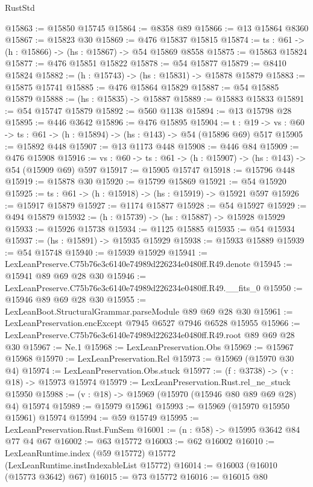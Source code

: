 \begin{lexlean}{RustStd}
\begin{coremodule}
@15863 := @15850 @15745
@15864 := @8358 @89
@15866 := @13 @15864 @8360
@15867 := @15823 @30
@15869 := @476 @15837 @15815
@15874 := {ts : @61} -> (h : @15866) -> (hs : @15867) -> @54 @15869 @8558
@15875 := @15863 @15824
@15877 := @476 @15851 @15822
@15878 := @54 @15877
@15879 := @8410 @15824
@15882 := (h : @15743) -> (hs : @15831) -> @15878 @15879
@15883 := @15875 @15741
@15885 := @476 @15864 @15829
@15887 := @54 @15885 @15879
@15888 := (hs : @15835) -> @15887
@15889 := @15883 @15833
@15891 := @54 @15747 @15879
@15892 := @560 @1138
@15894 := @13 @15798 @28
@15895 := @446 @3642
@15896 := @476 @15895
@15904 := {t : @19} ->
  {vs : @60} -> {ts : @61} -> (h : @15894) -> (hs : @143) -> @54 (@15896 @69) @517
@15905 := @15892 @448
@15907 := @13 @1173 @448
@15908 := @446 @84
@15909 := @476 @15908
@15916 := {vs : @60} -> {ts : @61} -> (h : @15907) -> (hs : @143) -> @54 (@15909 @69) @597
@15917 := @15905 @15747
@15918 := @15796 @448
@15919 := @15878 @30
@15920 := @15799 @15869
@15921 := @54 @15920
@15925 := {ts : @61} -> (h : @15918) -> (hs : @15919) -> @15921 @597
@15926 := @15917 @15879
@15927 := @1174 @15877
@15928 := @54 @15927
@15929 := @494 @15879
@15932 := (h : @15739) -> (hs : @15887) -> @15928 @15929
@15933 := @15926 @15738
@15934 := @1125 @15885
@15935 := @54 @15934
@15937 := (hs : @15891) -> @15935 @15929
@15938 := @15933 @15889
@15939 := @54 @15748
@15940 := @15939 @15929
@15941 := LexLeanPreserve.C75b76e3c6140e74989d226234e0480ff.R49.denote
@15945 := @15941 @89 @69 @28 @30
@15946 := LexLeanPreserve.C75b76e3c6140e74989d226234e0480ff.R49.__fits_0
@15950 := @15946 @89 @69 @28 @30
@15955 := LexLeanBoot.StructuralGrammar.parseModule @89 @69 @28 @30
@15961 := LexLeanPreservation.encExcept @7945 @6527 @7946 @6528 @15955
@15966 := LexLeanPreserve.C75b76e3c6140e74989d226234e0480ff.R49.root @89 @69 @28 @30
@15967 := Ne.{1}
@15968 := LexLeanPreservation.Obs
@15969 := @15967 @15968
@15970 := LexLeanPreservation.Rel
@15973 := @15969 (@15970 @30 @4)
@15974 := LexLeanPreservation.Obs.stuck
@15977 := (f : @3738) -> (v : @18) -> @15973 @15974
@15979 := LexLeanPreservation.Rust.rel_ne_stuck @15950
@15988 := (v : @18) -> @15969 (@15970 (@15946 @80 @89 @69 @28) @4) @15974
@15989 := @15979 @15961
@15993 := @15969 (@15970 @15950 @15961) @15974
@15994 := @59 @15749
@15995 := LexLeanPreservation.Rust.FunSem
@16001 := (n : @58) -> @15995 @3642 @84 @77 @4 @67
@16002 := @63 @15772
@16003 := @62 @16002
@16010 := LexLeanRuntime.index (@59 @15772) @15772 (LexLeanRuntime.instIndexableList @15772)
@16014 := @16003 (@16010 (@15773 @3642) @67)
@16015 := @73 @15772
@16016 := @16015 @80

\end{coremodule}
\end{lexlean}
